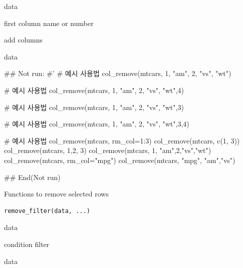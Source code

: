 \documentclass[a4paper]{book}
\begin{document}
%
\begin{Arguments}
\begin{ldescription}
\item[\code{data}] data

\item[\code{rm\_col}] first column name or number

\item[\code{...}] add columns
\end{ldescription}
\end{Arguments}
%
\begin{Value}
data
\end{Value}
%
\begin{Examples}
\begin{ExampleCode}
\#\# Not run: 
#'
# 예시 사용법
col_remove(mtcars, 1, "am", 2, "vs", "wt")

# 예시 사용법
col_remove(mtcars, 1, "am", 2, "vs", "wt",4)


# 예시 사용법
col_remove(mtcars, 1, "am", 2, "vs", "wt",3)


# 예시 사용법
col_remove(mtcars, 1, "am", 2, "vs", "wt",3,4)

# 예시 사용법
col_remove(mtcars, rm_col=1:3)
col_remove(mtcars, c(1, 3))
col_remove(mtcars, 1,2, 3)
col_remove(mtcars, 1, "am",2,"vs","wt")
col_remove(mtcars, rm_col="mpg")
col_remove(mtcars, "mpg", "am","vs")


## End(Not run)


\end{ExampleCode}
\end{Examples}
%
\begin{Description}
Functions to remove selected rows
\end{Description}
%
\begin{Usage}
\begin{verbatim}
remove_filter(data, ...)
\end{verbatim}
\end{Usage}
%
\begin{Arguments}
\begin{ldescription}
\item[\code{data}] data

\item[\code{...}] condition filter
\end{ldescription}
\end{Arguments}
%
\begin{Value}
data
\end{Value}
\end{document}
